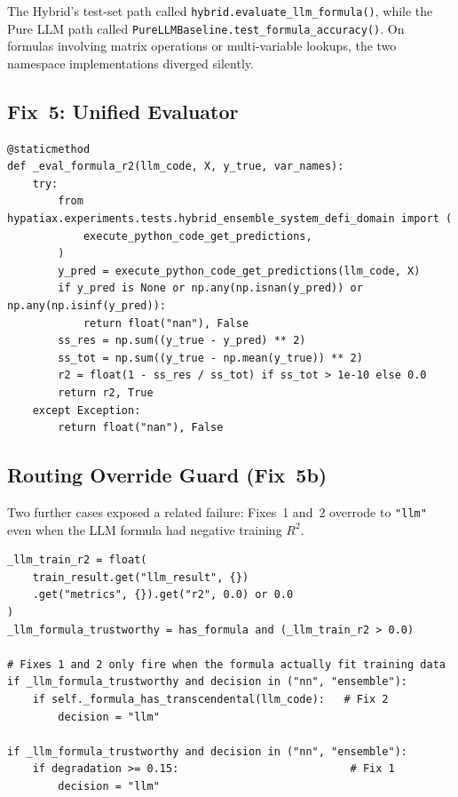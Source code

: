 \documentclass[twoside,11pt]{article}
\begin{document}
The Hybrid's test-set path called \texttt{hybrid.evaluate\_llm\_formula()},
while the Pure LLM path called
\texttt{PureLLMBaseline.test\_formula\_accuracy()}.  On formulas involving
matrix operations or multi-variable lookups, the two namespace implementations
diverged silently.

\subsection{Fix~5: Unified Evaluator}

\begin{lstlisting}[caption={Unified formula evaluator (Fix~5).}]
@staticmethod
def _eval_formula_r2(llm_code, X, y_true, var_names):
    try:
        from hypatiax.experiments.tests.hybrid_ensemble_system_defi_domain import (
            execute_python_code_get_predictions,
        )
        y_pred = execute_python_code_get_predictions(llm_code, X)
        if y_pred is None or np.any(np.isnan(y_pred)) or np.any(np.isinf(y_pred)):
            return float("nan"), False
        ss_res = np.sum((y_true - y_pred) ** 2)
        ss_tot = np.sum((y_true - np.mean(y_true)) ** 2)
        r2 = float(1 - ss_res / ss_tot) if ss_tot > 1e-10 else 0.0
        return r2, True
    except Exception:
        return float("nan"), False
\end{lstlisting}

\subsection{Routing Override Guard (Fix~5b)}

Two further cases exposed a related failure: Fixes~1 and~2 overrode to
\texttt{"llm"} even when the LLM formula had negative training $R^2$.

\begin{lstlisting}[caption={LLM-formula trustworthiness guard.}]
_llm_train_r2 = float(
    train_result.get("llm_result", {})
    .get("metrics", {}).get("r2", 0.0) or 0.0
)
_llm_formula_trustworthy = has_formula and (_llm_train_r2 > 0.0)

# Fixes 1 and 2 only fire when the formula actually fit training data
if _llm_formula_trustworthy and decision in ("nn", "ensemble"):
    if self._formula_has_transcendental(llm_code):   # Fix 2
        decision = "llm"

if _llm_formula_trustworthy and decision in ("nn", "ensemble"):
    if degradation >= 0.15:                           # Fix 1
        decision = "llm"
\end{lstlisting}
\end{document}
